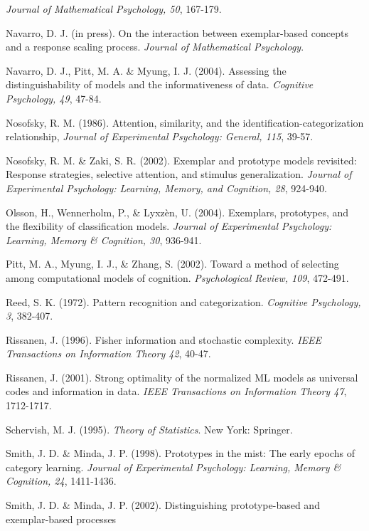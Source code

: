 \documentclass[11pt]{article}
\begin{document}
\begin{list}{}{\setlength{\leftmargin}{10pt}\setlength{\itemindent}{-10pt}\setlength{\parsep}{-1pt}}
{\it Journal of Mathematical Psychology, 50}, 167-179.
\item Navarro, D. J. (in press).  On the interaction between exemplar-based concepts and a response
scaling process. {\it Journal of Mathematical Psychology}.
\item Navarro, D. J., Pitt, M. A. \& Myung, I. J. (2004).  Assessing the distinguishability of models and the
informativeness of data. {\it Cognitive Psychology, 49}, 47-84.
\item Nosofsky, R. M. (1986). Attention, similarity, and the identification-categorization relationship,
{\it Journal of Experimental Psychology: General, 115}, 39-57.
\item Nosofsky, R. M. \& Zaki, S. R. (2002). Exemplar and prototype models revisited: Response strategies,
selective attention, and stimulus generalization. {\it Journal of Experimental Psychology:
Learning, Memory, and Cognition, 28}, 924-940.
\item Olsson, H., Wennerholm, P., \& Lyxz\`{e}n, U. (2004). Exemplars, prototypes, and the flexibility of
 classification models. {\it Journal of Experimental Psychology: Learning, Memory \& Cognition, 30}, 936-941.
\item Pitt, M. A., Myung, I. J., \& Zhang, S. (2002). Toward a method of selecting among computational models
of cognition. {\it Psychological Review, 109}, 472-491.
\item Reed, S. K. (1972). Pattern recognition and categorization. {\it Cognitive Psychology, 3}, 382-407.
\item Rissanen, J. (1996). Fisher information and stochastic complexity. {\it IEEE Transactions on Information
Theory 42}, 40-47.
\item Rissanen, J. (2001). Strong optimality of the normalized ML models as universal codes and
information in data. {\it IEEE Transactions on Information Theory 47}, 1712-1717.
\item Schervish, M. J. (1995). {\it Theory of Statistics}. New York: Springer.
\item Smith, J. D. \& Minda, J. P. (1998). Prototypes in the mist: The early epochs of category learning.
{\it Journal of Experimental Psychology: Learning, Memory \& Cognition, 24}, 1411-1436.
\item Smith, J. D. \& Minda, J. P. (2002). Distinguishing prototype-based and exemplar-based processes

\end{list}
\end{document}

